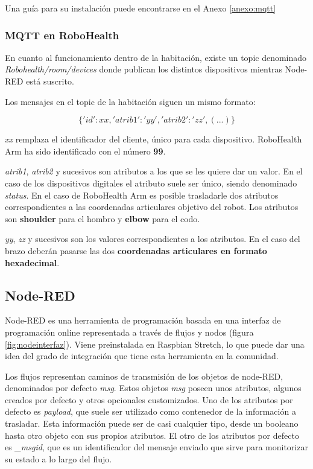 Una guía para su instalación puede encontrarse en el Anexo \ref{anexo:mqtt}

\subsubsection{MQTT en RoboHealth}\label{subsubsec:RH_MQTT}

En cuanto al funcionamiento dentro de la habitación, existe un topic denominado \textit{Robohealth/room/devices} donde publican los distintos dispositivos mientras Node-RED está suscrito.

Los mensajes en el topic de la habitación siguen un mismo formato:

$$\{'id':xx,'atrib1':'yy','atrib2':'zz',(...)\}$$

\textit{xx} remplaza el identificador del cliente, único para cada dispositivo. RoboHealth Arm ha sido identificado con el número \textbf{99}.

\textit{atrib1}, \textit{atrib2} y sucesivos son atributos a los que se les quiere dar un valor. En el caso de los dispositivos digitales el atributo suele ser único, siendo denominado \textit{status}. En el caso de RoboHealth Arm es posible trasladarle dos atributos correspondientes a las coordenadas articulares objetivo del robot. Los atributos son \textbf{shoulder} para el hombro y \textbf{elbow} para el codo.

\textit{yy}, \textit{zz} y sucesivos son los valores correspondientes a los atributos. En el caso del brazo deberán pasarse las dos \textbf{coordenadas articulares en formato hexadecimal}.

\subsection{Node-RED}\label{subsec:nodered}

Node-RED es una herramienta de programación basada en una interfaz de programación online representada a través de flujos y nodos (figura \ref{fig:nodeinterfaz}). Viene preinstalada en Raspbian Stretch, lo que puede dar una idea del grado de integración que tiene esta herramienta en la comunidad.

Los flujos representan caminos de transmisión de los objetos de node-RED, denominados por defecto \textit{msg}. Estos objetos \textit{msg} poseen unos atributos, algunos creados por defecto y otros opcionales customizados. Uno de los atributos por defecto es \textit{payload}, que suele ser utilizado como contenedor de la información a trasladar. Esta información puede ser de casi cualquier tipo, desde un booleano hasta otro objeto con sus propios atributos. El otro de los atributos por defecto es \textit{\_msgid}, que es un identificador del mensaje enviado que sirve para monitorizar su estado a lo largo del flujo.

